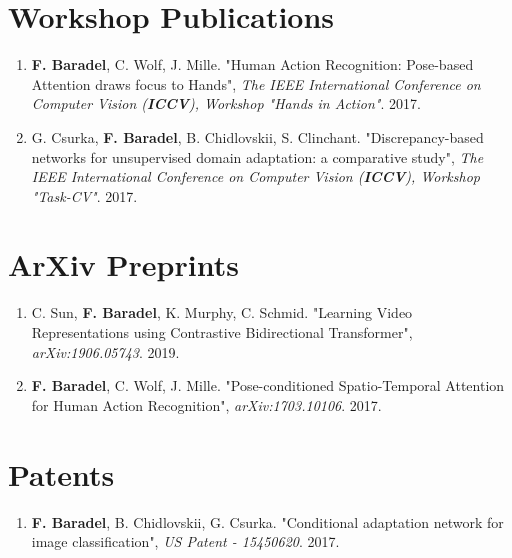 \documentclass[10pt]{res} %
\begin{document}
\begin{resume}
\section{\large Workshop Publications}
\begin{enumerate}[wide=0pt]
	\item \textbf{F. Baradel}, C. Wolf, J. Mille. "Human Action Recognition: Pose-based Attention draws focus to Hands", \textit{The IEEE International Conference on Computer Vision (\textbf{ICCV}), Workshop "Hands in Action"}. 2017.
	\item G. Csurka, \textbf{F. Baradel}, B. Chidlovskii, S. Clinchant. "Discrepancy-based networks for unsupervised domain adaptation: a comparative study",  \textit{The IEEE International Conference on Computer Vision (\textbf{ICCV}), Workshop "Task-CV"}. 2017.
\end{enumerate}



\section{\large ArXiv Preprints} 
\begin{enumerate}[wide=0pt]
	\item C. Sun, \textbf{F. Baradel}, K. Murphy, C. Schmid. "Learning Video Representations using Contrastive Bidirectional Transformer", \textit{arXiv:1906.05743}. 2019.
	\item \textbf{F. Baradel}, C. Wolf, J. Mille. "Pose-conditioned Spatio-Temporal Attention for Human Action Recognition",  \textit{arXiv:1703.10106}. 2017.
\end{enumerate}


\section{\large Patents}
\begin{enumerate}[wide=0pt]
	\item \textbf{F. Baradel}, B. Chidlovskii, G. Csurka. "Conditional adaptation network for image classification",  \textit{US Patent - 15450620}. 2017.
\end{enumerate}


\end{resume}
\end{document}
